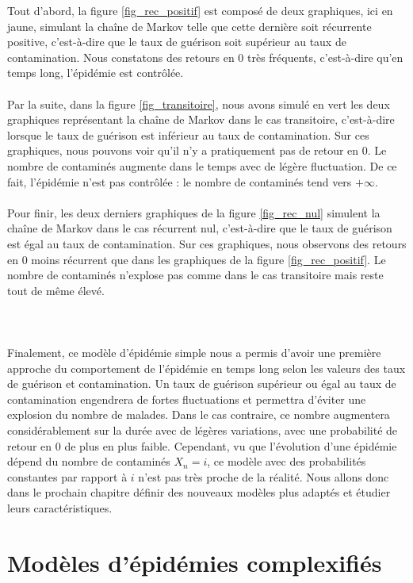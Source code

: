 \documentclass[12pt,a4paper]{report}
\theoremstyle{remark}
\begin{document}
Tout d'abord, la figure \ref{fig_rec_positif} est composé de deux graphiques, ici en jaune, simulant la chaîne de Markov telle que cette dernière soit récurrente positive, c'est-à-dire que le taux de guérison soit supérieur au taux de contamination. Nous constatons des retours en $0$ très fréquents, c'est-à-dire qu'en temps long, l'épidémie est contrôlée. \\
\\
Par la suite, dans la figure \ref{fig_transitoire}, nous avons simulé en vert les deux graphiques représentant la chaîne de Markov dans le cas transitoire, c'est-à-dire lorsque le taux de guérison est inférieur au taux de contamination. Sur ces graphiques, nous pouvons voir qu'il n'y a pratiquement pas de retour en $0$. Le nombre de contaminés augmente dans le temps avec de légère fluctuation. De ce fait, l'épidémie n'est pas contrôlée : le nombre de contaminés tend vers $+\infty$.\\
\\
Pour finir, les deux derniers graphiques de la figure \ref{fig_rec_nul} simulent la chaîne de Markov dans le cas récurrent nul, c'est-à-dire que le taux de guérison est égal au taux de contamination. Sur ces graphiques, nous observons des retours en $0$ moins récurrent que dans les graphiques de la figure \ref{fig_rec_positif}. Le nombre de contaminés n'explose pas comme dans le cas transitoire mais reste tout de même élevé.
\\
\\
\\
\\
Finalement, ce modèle d'épidémie simple nous a permis d'avoir une première approche du comportement de l'épidémie en temps long selon les valeurs des taux de guérison et contamination. Un taux de guérison supérieur ou égal au taux de contamination engendrera de fortes fluctuations et permettra d'éviter une explosion du nombre de malades. Dans le cas contraire, ce nombre augmentera considérablement sur la durée avec de légères variations, avec une probabilité de retour en $0$ de plus en plus faible. Cependant, vu que l'évolution d'une épidémie dépend du nombre de contaminés $X_n = i$, ce modèle avec des probabilités constantes par rapport à $i$ n'est pas très proche de la réalité. Nous allons donc dans le prochain chapitre définir des nouveaux modèles plus adaptés et étudier leurs caractéristiques.

\chapter{Modèles d'épidémies complexifiés}
\end{document}
